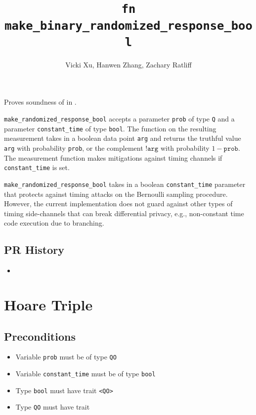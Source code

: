 \documentclass{article}
\title{\texttt{fn make\_binary\_randomized\_response\_bool}}
\author{Vicki Xu, Hanwen Zhang, Zachary Ratliff}
\begin{document}
\maketitle

\contrib

Proves soundness of  in .

\texttt{make\_randomized\_response\_bool} accepts a parameter \texttt{prob} of type \texttt{Q} and a parameter \texttt{constant\_time} of type \texttt{bool}.
The function on the resulting measurement takes in a boolean data point \texttt{arg} and returns the truthful value \texttt{arg} with probability \texttt{prob},
or the complement $\texttt{!arg}$ with probability $1 - \texttt{prob}$.
The measurement function makes mitigations against timing channels if \texttt{constant\_time} is set. 

\begin{tcolorbox}
    \begin{warning}
        \texttt{make\_randomized\_response\_bool} takes in a boolean \texttt{constant\_time} parameter that protects against timing attacks on the Bernoulli sampling procedure. 
        However, the current implementation does not guard against other types of timing side-channels that can break differential privacy, e.g., non-constant time code execution due to branching.
    \end{warning}
\end{tcolorbox}

\subsection*{PR History}
\begin{itemize}
    \item {}
\end{itemize}

\section{Hoare Triple}

\subsection*{Preconditions}
\begin{itemize}
    \item Variable \texttt{prob} must be of type \texttt{QO}
    \item Variable \texttt{constant\_time} must be of type \texttt{bool}
    \item Type \texttt{bool} must have trait \texttt{<QO>}
    \item Type \texttt{QO} must have trait 
\end{itemize}
\end{document}
